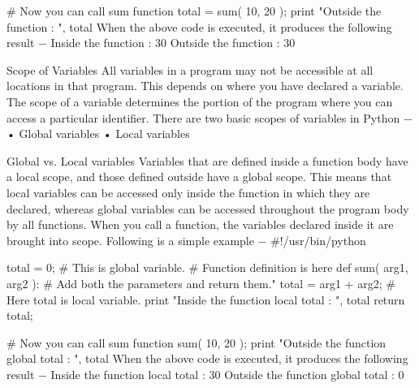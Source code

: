 	# Now you can call sum function
	total = sum( 10, 20 );
	print "Outside the function : ", total 
When the above code is executed, it produces the following result −
	Inside the function :  30
	Outside the function :  30

Scope of Variables
All variables in a program may not be accessible at all locations in that program. This depends on where you have declared a variable.
The scope of a variable determines the portion of the program where you can access a particular identifier. There are two basic scopes of variables in Python −
•	Global variables
•	Local variables

Global vs. Local variables
Variables that are defined inside a function body have a local scope, and those defined outside have a global scope.
This means that local variables can be accessed only inside the function in which they are declared, whereas global variables can be accessed throughout the program body by all functions. When you call a function, the variables declared inside it are brought into scope. Following is a simple example −
	#!/usr/bin/python

	total = 0; # This is global variable.
	# Function definition is here
	def sum( arg1, arg2 ):
	   # Add both the parameters and return them."
	   total = arg1 + arg2; # Here total is local variable.
	   print "Inside the function local total : ", total
	   return total;
	
	# Now you can call sum function
	sum( 10, 20 );
	print "Outside the function global total : ", total 
When the above code is executed, it produces the following result −
	Inside the function local total :  30
	Outside the function global total :  0
	

